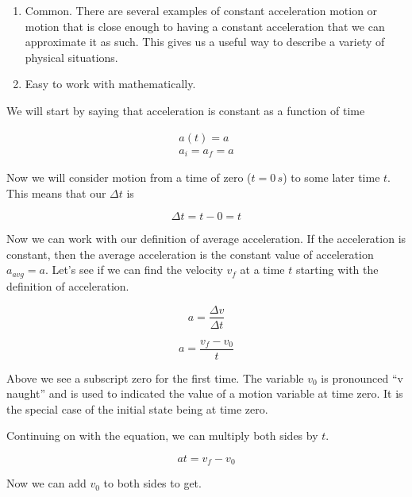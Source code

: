 \documentclass[12pt]{book}
\begin{document}
\begin{enumerate}
\item Common. There are several examples of constant acceleration motion or motion that is close enough to having a constant acceleration that we can approximate it as such. This gives us a useful way to describe a variety of physical situations.

\item Easy to work with mathematically.
\end{enumerate}

We will start by saying that acceleration is constant as a function of time

\begin{equation}
\begin{split}
a(t) = a \\
a_i = a_f = a
\end{split}
\end{equation}

Now we will consider motion from a time of zero ($t = 0 \, s$) to some later time $t$. This means that our $\Delta t$ is

\begin{equation}
\Delta t = t - 0 = t
\end{equation}

Now we can work with our definition of average acceleration. If the acceleration is constant, then the average acceleration is the constant value of acceleration $a_{avg} = a$. Let's see if we can find the velocity $v_f$ at a time $t$ starting with the definition of acceleration.

\begin{equation}
a = \frac{\Delta v}{\Delta t}
\end{equation}

\begin{equation}
a = \frac{v_f - v_0}{t}
\end{equation}

Above we see a subscript zero for the first time. The variable $v_0$ is pronounced ``v naught'' and is used to indicated the value of a motion variable at time zero. It is the special case of the initial state being at time zero.

Continuing on with the equation, we can multiply both sides by $t$.

\begin{equation}
at = v_f - v_0
\end{equation}

Now we can add $v_0$ to both sides to get.
\end{document}
